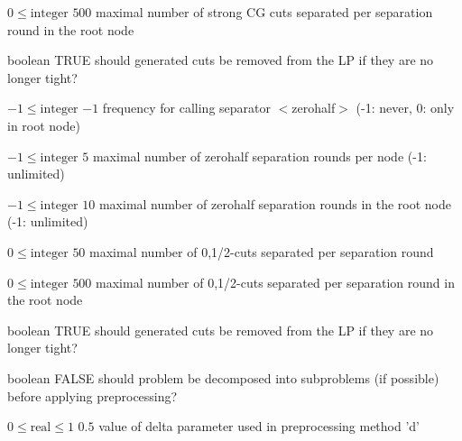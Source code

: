 %
{$0\leq\textrm{integer}$}%
{$500$}%
{maximal number of strong CG cuts separated per separation round in the root node}%
{}

%
{boolean}%
{TRUE}%
{should generated cuts be removed from the LP if they are no longer tight?}%
{}

%
{$-1\leq\textrm{integer}$}%
{$-1$}%
{frequency for calling separator $<$zerohalf$>$ (-1: never, 0: only in root node)}%
{}

%
{$-1\leq\textrm{integer}$}%
{$5$}%
{maximal number of zerohalf separation rounds per node (-1: unlimited)}%
{}

%
{$-1\leq\textrm{integer}$}%
{$10$}%
{maximal number of zerohalf separation rounds in the root node (-1: unlimited)}%
{}

%
{$0\leq\textrm{integer}$}%
{$50$}%
{maximal number of {0,1/2}-cuts separated per separation round}%
{}

%
{$0\leq\textrm{integer}$}%
{$500$}%
{maximal number of {0,1/2}-cuts separated per separation round in the root node}%
{}

%
{boolean}%
{TRUE}%
{should generated cuts be removed from the LP if they are no longer tight?}%
{}

%
{boolean}%
{FALSE}%
{should problem be decomposed into subproblems (if possible) before applying preprocessing?}%
{}

%
{$0\leq\textrm{real}\leq1$}%
{$0.5$}%
{value of delta parameter used in preprocessing method 'd'}%
{}

